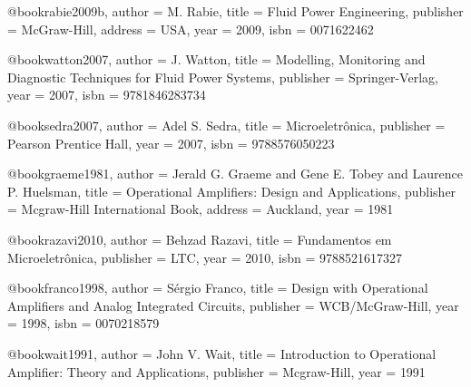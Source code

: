 @book{rabie2009b,
  author = {M. Rabie},
  title = {Fluid Power Engineering},
  publisher = {McGraw-Hill},
  address = {USA},
  year = {2009},
  isbn = {0071622462}
}

@book{watton2007,
  author = {J. Watton},
  title = {Modelling, Monitoring and Diagnostic Techniques for Fluid Power Systems},
  publisher = {Springer-Verlag},
  year = {2007},
  isbn = {9781846283734}
}

%

@book{sedra2007,
  author = {Adel S. Sedra},
  title = {Microeletrônica},
  publisher = {Pearson Prentice Hall},
  year = {2007},
  isbn = {9788576050223}
}

@book{graeme1981,
  author = {Jerald G. Graeme and Gene E. Tobey and Laurence P. Huelsman},
  title = {Operational Amplifiers: Design and Applications},
  publisher = {Mcgraw-Hill International Book},
  address = {Auckland},
  year = {1981}
}

@book{razavi2010,
  author = {Behzad Razavi},
  title = {Fundamentos em Microeletrônica},
  publisher = {LTC},
  year = {2010},
  isbn = {9788521617327}
}

@book{franco1998,
  author = {Sérgio Franco},
  title = {Design with Operational Amplifiers and Analog Integrated Circuits},
  publisher = {WCB/McGraw-Hill},
  year = {1998},
  isbn = {0070218579}
}

@book{wait1991,
  author = {John V. Wait},
  title = {Introduction to Operational Amplifier: Theory and Applications},
  publisher = {Mcgraw-Hill},
  year = {1991}
}

